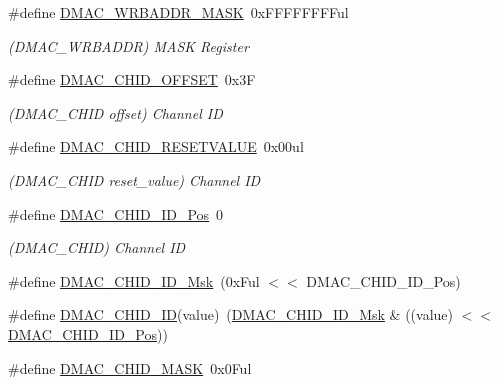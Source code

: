 \begin{DoxyCompactItemize}
\item 
\#define \mbox{\hyperlink{group___s_a_m_d21___d_m_a_c_ga71d8874eef4222a9ac8a6e9bdfb68095}{D\+M\+A\+C\+\_\+\+W\+R\+B\+A\+D\+D\+R\+\_\+\+M\+A\+SK}}~0x\+F\+F\+F\+F\+F\+F\+F\+Ful
\begin{DoxyCompactList}\small\item\em (D\+M\+A\+C\+\_\+\+W\+R\+B\+A\+D\+DR) M\+A\+SK Register \end{DoxyCompactList}\item 
\#define \mbox{\hyperlink{group___s_a_m_d21___d_m_a_c_gac2d75cd66a0e511ab0cd4e14894aa1c6}{D\+M\+A\+C\+\_\+\+C\+H\+I\+D\+\_\+\+O\+F\+F\+S\+ET}}~0x3F
\begin{DoxyCompactList}\small\item\em (D\+M\+A\+C\+\_\+\+C\+H\+ID offset) Channel ID \end{DoxyCompactList}\item 
\#define \mbox{\hyperlink{group___s_a_m_d21___d_m_a_c_ga50d71c48a7b89b8331d0a8bda33a3f87}{D\+M\+A\+C\+\_\+\+C\+H\+I\+D\+\_\+\+R\+E\+S\+E\+T\+V\+A\+L\+UE}}~0x00ul
\begin{DoxyCompactList}\small\item\em (D\+M\+A\+C\+\_\+\+C\+H\+ID reset\+\_\+value) Channel ID \end{DoxyCompactList}\item 
\#define \mbox{\hyperlink{group___s_a_m_d21___d_m_a_c_gadd98c1694377b5bb1a53b33057d6460b}{D\+M\+A\+C\+\_\+\+C\+H\+I\+D\+\_\+\+I\+D\+\_\+\+Pos}}~0
\begin{DoxyCompactList}\small\item\em (D\+M\+A\+C\+\_\+\+C\+H\+ID) Channel ID \end{DoxyCompactList}\item 
\#define \mbox{\hyperlink{group___s_a_m_d21___d_m_a_c_ga13c87f8311b7e73880303b73611d7f8c}{D\+M\+A\+C\+\_\+\+C\+H\+I\+D\+\_\+\+I\+D\+\_\+\+Msk}}~(0x\+Ful $<$$<$ D\+M\+A\+C\+\_\+\+C\+H\+I\+D\+\_\+\+I\+D\+\_\+\+Pos)
\item 
\#define \mbox{\hyperlink{group___s_a_m_d21___d_m_a_c_ga29602254ebe1642d2db7babefd6113c0}{D\+M\+A\+C\+\_\+\+C\+H\+I\+D\+\_\+\+ID}}(value)~(\mbox{\hyperlink{group___s_a_m_d21___d_m_a_c_ga13c87f8311b7e73880303b73611d7f8c}{D\+M\+A\+C\+\_\+\+C\+H\+I\+D\+\_\+\+I\+D\+\_\+\+Msk}} \& ((value) $<$$<$ \mbox{\hyperlink{group___s_a_m_d21___d_m_a_c_gadd98c1694377b5bb1a53b33057d6460b}{D\+M\+A\+C\+\_\+\+C\+H\+I\+D\+\_\+\+I\+D\+\_\+\+Pos}}))
\item 
\#define \mbox{\hyperlink{group___s_a_m_d21___d_m_a_c_ga831d21426d638b1c0f402d6db4ceddf5}{D\+M\+A\+C\+\_\+\+C\+H\+I\+D\+\_\+\+M\+A\+SK}}~0x0\+Ful

\end{DoxyCompactItemize}
